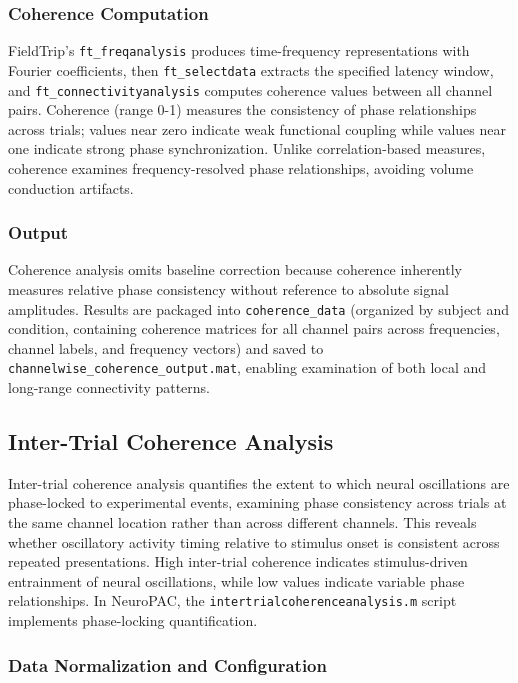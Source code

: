 \documentclass[12pt]{report}
\begin{document}
\subsubsection{Coherence Computation}

FieldTrip's \verb|ft_freqanalysis| produces time-frequency representations with Fourier coefficients, then \verb|ft_selectdata| extracts the specified latency window, and \verb|ft_connectivityanalysis| computes coherence values between all channel pairs. Coherence (range 0-1) measures the consistency of phase relationships across trials; values near zero indicate weak functional coupling while values near one indicate strong phase synchronization. Unlike correlation-based measures, coherence examines frequency-resolved phase relationships, avoiding volume conduction artifacts.

\subsubsection{Output}

Coherence analysis omits baseline correction because coherence inherently measures relative phase consistency without reference to absolute signal amplitudes. Results are packaged into \verb|coherence_data| (organized by subject and condition, containing coherence matrices for all channel pairs across frequencies, channel labels, and frequency vectors) and saved to \verb|channelwise_coherence_output.mat|, enabling examination of both local and long-range connectivity patterns.

\subsection{Inter-Trial Coherence Analysis}

Inter-trial coherence analysis quantifies the extent to which neural oscillations are phase-locked to experimental events, examining phase consistency across trials at the same channel location rather than across different channels. This reveals whether oscillatory activity timing relative to stimulus onset is consistent across repeated presentations. High inter-trial coherence indicates stimulus-driven entrainment of neural oscillations, while low values indicate variable phase relationships. In NeuroPAC, the \verb|intertrialcoherenceanalysis.m| script implements phase-locking quantification.

\subsubsection{Data Normalization and Configuration}
\end{document}
